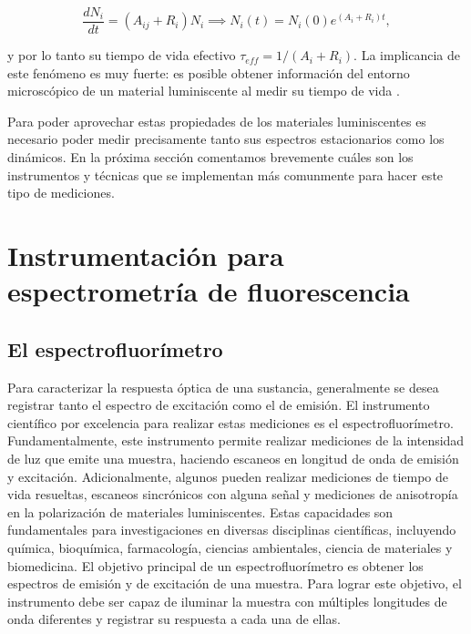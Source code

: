 \begin{equation}
    \frac{dN_i}{dt} = (A_{ij} + R_i) N_i \implies N_i(t) = N_i(0)e^{(A_i + R_i) t},
\end{equation}

\noindent y por lo tanto su tiempo de vida efectivo $\tau_{eff} = 1/(A_i + R_i)$. 
La implicancia de este fenómeno es muy fuerte: es posible obtener información del entorno microscópico de un material luminiscente al medir su tiempo de vida \cite{ryder_timedomain_2001}.

Para poder aprovechar estas propiedades de los materiales luminiscentes es necesario poder medir precisamente tanto sus espectros estacionarios como los dinámicos. 
En la próxima sección comentamos brevemente cuáles son los instrumentos y técnicas que se implementan más comunmente para hacer este tipo de mediciones.


\section{Instrumentación para espectrometría de fluorescencia}

\subsection{El espectrofluorímetro}

Para caracterizar la respuesta óptica de una sustancia, generalmente se desea registrar tanto el espectro de excitación como el de emisión. 
El instrumento científico por excelencia para realizar estas mediciones es el espectrofluorímetro. 
Fundamentalmente, este instrumento permite realizar mediciones de la intensidad de luz que emite una muestra, haciendo escaneos en longitud de onda de emisión y excitación.
Adicionalmente, algunos pueden realizar mediciones de tiempo de vida resueltas, escaneos sincrónicos con alguna señal y mediciones de anisotropía en la polarización de materiales luminiscentes.
Estas capacidades son fundamentales para investigaciones en diversas disciplinas científicas, incluyendo química, bioquímica, farmacología, ciencias ambientales, ciencia de materiales y biomedicina.
El objetivo principal de un espectrofluorímetro es obtener los espectros de emisión y de excitación de una muestra.
Para lograr este objetivo, el instrumento debe ser capaz de iluminar la muestra con múltiples longitudes de onda diferentes y registrar su respuesta a cada una de ellas.

